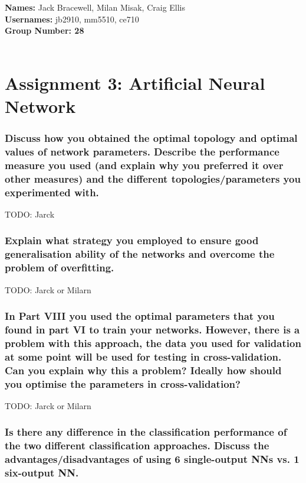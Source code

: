 \documentclass[12pt]{article}
\begin{document}
{\bf Names:} Jack Bracewell, Milan Misak, Craig Ellis \\
{\bf Usernames:} jb2910, mm5510, ce710 \\
{\bf Group Number: 28}  \\ \\

\section*{Assignment 3: Artificial Neural Network}

\subsubsection*{Discuss how you obtained the optimal topology and optimal values of network parameters. Describe the performance measure you used (and explain why you preferred it over other measures) and the different topologies/parameters you experimented with.}

TODO: Jarck \\


\subsubsection*{Explain what strategy you employed to ensure good generalisation ability of the networks and overcome the problem of overfitting.}

TODO: Jarck or Milarn \\


\subsubsection*{In Part VIII you used the optimal parameters that you found in part VI to train your networks. However, there is a problem with this approach, the data you used for validation at some point will be used for testing in cross-validation. Can you explain why this a problem? Ideally how should you optimise the parameters in cross-validation?}

TODO: Jarck or Milarn\\


\subsubsection*{Is there any difference in the classification performance of the two different classification approaches. Discuss the advantages/disadvantages of using 6 single-output NNs vs. 1 six-output NN.}
\end{document}
